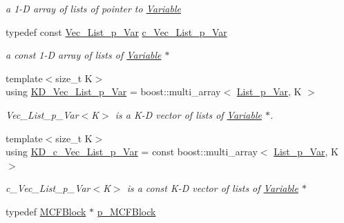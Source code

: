 \begin{DoxyCompactItemize}
\begin{DoxyCompactList}\small\item\em a 1-\/D array of lists of pointer to \mbox{\hyperlink{class_s_m_spp__di__unipi__it_1_1_variable}{Variable}} \end{DoxyCompactList}\item 
typedef const \mbox{\hyperlink{group___variable___t_y_p_e_s_ga5c28c8956e72a58b668b86adad8c7805}{Vec\+\_\+\+List\+\_\+p\+\_\+\+Var}} \mbox{\hyperlink{group___variable___t_y_p_e_s_ga5419498ee46468a022e7234342622423}{c\+\_\+\+Vec\+\_\+\+List\+\_\+p\+\_\+\+Var}}
\begin{DoxyCompactList}\small\item\em a const 1-\/D array of lists of \mbox{\hyperlink{class_s_m_spp__di__unipi__it_1_1_variable}{Variable}} $\ast$ \end{DoxyCompactList}\item 
{\footnotesize template$<$size\+\_\+t K$>$ }\\using \mbox{\hyperlink{group___variable___t_y_p_e_s_gaf0ca613b1f488591d43c188ab5e94323}{K\+D\+\_\+\+Vec\+\_\+\+List\+\_\+p\+\_\+\+Var}} = boost\+::multi\+\_\+array$<$ \mbox{\hyperlink{group___variable___t_y_p_e_s_ga1fccfcb7d57847e2b9ba2fa0c6100b80}{List\+\_\+p\+\_\+\+Var}}, K $>$
\begin{DoxyCompactList}\small\item\em Vec\+\_\+\+List\+\_\+p\+\_\+\+Var$<$\+K$>$ is a K-\/D vector of lists of \mbox{\hyperlink{class_s_m_spp__di__unipi__it_1_1_variable}{Variable}} $\ast$. \end{DoxyCompactList}\item 
{\footnotesize template$<$size\+\_\+t K$>$ }\\using \mbox{\hyperlink{group___variable___t_y_p_e_s_ga9d7332f91da35bffa8fb8a96b3c3702d}{K\+D\+\_\+c\+\_\+\+Vec\+\_\+\+List\+\_\+p\+\_\+\+Var}} = const boost\+::multi\+\_\+array$<$ \mbox{\hyperlink{group___variable___t_y_p_e_s_ga1fccfcb7d57847e2b9ba2fa0c6100b80}{List\+\_\+p\+\_\+\+Var}}, K $>$
\begin{DoxyCompactList}\small\item\em c\+\_\+\+Vec\+\_\+\+List\+\_\+p\+\_\+\+Var$<$\+K$>$ is a const K-\/D vector of lists of \mbox{\hyperlink{class_s_m_spp__di__unipi__it_1_1_variable}{Variable}} $\ast$ \end{DoxyCompactList}\item 
typedef \mbox{\hyperlink{class_s_m_spp__di__unipi__it_1_1_m_c_f_block}{M\+C\+F\+Block}} $\ast$ \mbox{\hyperlink{group___m_c_f_block___t_y_p_e_s_gadd093efb785d0de13da72a397653b760}{p\+\_\+\+M\+C\+F\+Block}}

\end{DoxyCompactItemize}

